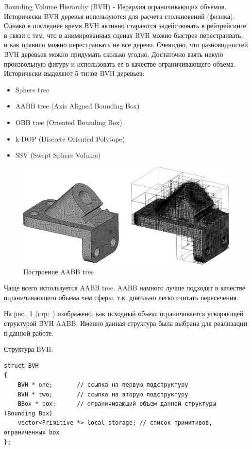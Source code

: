 \documentclass[12pt, a4paper, utf8]{article}
\begin{document}
Bounding Volume Hierarchy (BVH) - Иерархия ограничивающих объемов. Исторически BVH деревья используются для расчета столкновений (физика). Однако в последнее время BVH активно стараются задействовать в рейтрейсинге в связи с тем, что в анимированных сценах BVH можно быстрее перестраивать, и как правило можно перестраивать не все дерево.
Очевидно, что разновидностей BVH деревьев можно придумать сколько угодно. Достаточно взять некую произвольную фигуру и использовать ее в качестве ограничивающего объема. Исторически выделяют 5 типов BVH деревьев:
\begin{itemize}
\item Sphere tree
\item AABB tree (Axis Aligned Bounding Box)
\item OBB tree (Oriented Bounding Box)
\item k-DOP (Discrete Oriented Polytope)
\item SSV (Swept Sphere Volume)
\end{itemize}

\begin{figure}[h]
\centering
\includegraphics[width=\textwidth]{imgs/aabb.png} 
\caption{Построение AABB tree}\label{fig:aabb_tree}
\end{figure}

Чаще всего используется AABB tree. AABB намного лучше подходят в качестве ограничивающего объема чем сферы, т.к. довольно легко считать пересечения. 

На рис.~\ref{fig:aabb_tree} (стр:~\pageref{fig:aabb_tree}) изображено, как исходный объект ограничивается ускоряющей структурой BVH AABB. Именно данная структура была выбрана для реализации в данной работе.

\noindent Структура BVH:~\begin{spacing}{0.9}
\begin{verbatim}
struct BVH
{
    BVH * one;       // ссылка на первую подструктуру
    BVH * two;       // ссылка на вторую подструктуру
    BBox * box;      // ограничивающий объем данной структуры (Bounding Box)
    vector<Primitive *> local_storage; // список примитивов, ограниченных box
};
\end{verbatim}
\end{spacing}~
\end{document}
